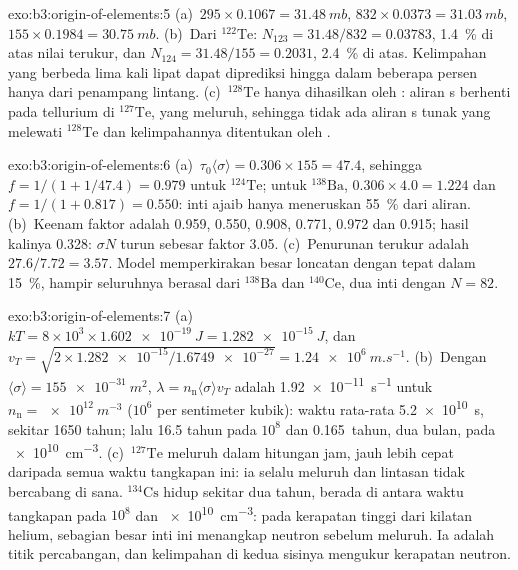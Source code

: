 \begin{solution}{exo:b3:origin-of-elements:5}
(a)~$295\times0.1067 = \qty{31.48}{mb}$, $832\times0.0373 =
\qty{31.03}{mb}$, $155\times0.1984 = \qty{30.75}{mb}$. (b)~Dari
$^{122}\mathrm{Te}$: $N_{123} = 31.48/832 = \num{0.03783}$, \qty{1.4}{\percent}
di atas nilai terukur, dan $N_{124} = 31.48/155 = \num{0.2031}$,
\qty{2.4}{\percent} di atas. Kelimpahan yang berbeda lima kali lipat
dapat diprediksi hingga dalam beberapa persen hanya dari penampang lintang.
(c)~$^{128}\mathrm{Te}$ hanya dihasilkan oleh : aliran s berhenti
pada tellurium di $^{127}\mathrm{Te}$, yang meluruh, sehingga tidak ada aliran s tunak yang
melewati $^{128}\mathrm{Te}$ dan kelimpahannya ditentukan oleh .
\end{solution}

\begin{solution}{exo:b3:origin-of-elements:6}
(a)~$\tau_0\langle\sigma\rangle = 0.306\times155 = 47.4$, sehingga
$f = 1/(1 + 1/47.4) = \num{0.979}$ untuk $^{124}\mathrm{Te}$; untuk
$^{138}\mathrm{Ba}$, $0.306\times4.0 = 1.224$ dan $f = 1/(1 + 0.817) =
\num{0.550}$: inti ajaib hanya meneruskan \qty{55}{\percent} dari
aliran. (b)~Keenam faktor adalah \num{0.959}, \num{0.550}, \num{0.908},
\num{0.771}, \num{0.972} dan \num{0.915}; hasil kalinya \num{0.328}:
$\sigma N$ turun sebesar faktor \num{3.05}. (c)~Penurunan terukur adalah
$27.6/7.72 = 3.57$. Model memperkirakan besar loncatan dengan tepat dalam
\qty{15}{\percent}, hampir seluruhnya berasal dari $^{138}\mathrm{Ba}$ dan
$^{140}\mathrm{Ce}$, dua inti dengan $N = 82$.
\end{solution}

\begin{solution}{exo:b3:origin-of-elements:7}
(a)~$kT = 8\times10^3\times\qty{1.602e-19}{J} = \qty{1.282e-15}{J}$, dan
$v_T = \sqrt{2\times\num{1.282e-15}/\num{1.6749e-27}} =
\qty{1.24e6}{m.s^{-1}}$. (b)~Dengan $\langle\sigma\rangle =
\qty{155e-31}{m^2}$, $\lambda = n_\mathrm{n}\langle\sigma\rangle v_T$
adalah \qty{1.92e-11}{s^{-1}} untuk $n_\mathrm{n} = \qty{e12}{m^{-3}}$
($10^6$ per sentimeter kubik): waktu rata-rata \qty{5.2e10}{s}, sekitar
\num{1650} tahun; lalu \num{16.5} tahun pada $10^8$ dan \num{0.165}~tahun,
dua bulan, pada \qty{e10}{cm^{-3}}. (c)~$^{127}\mathrm{Te}$ meluruh dalam
hitungan jam, jauh lebih cepat daripada semua waktu tangkapan ini: ia selalu meluruh dan
lintasan tidak bercabang di sana. $^{134}\mathrm{Cs}$ hidup sekitar dua
tahun, berada di antara waktu tangkapan pada $10^8$ dan \qty{e10}{cm^{-3}}: pada
kerapatan tinggi dari kilatan helium, sebagian besar inti ini menangkap
neutron sebelum meluruh. Ia adalah titik percabangan, dan kelimpahan di kedua
sisinya mengukur kerapatan neutron.
\end{solution}

